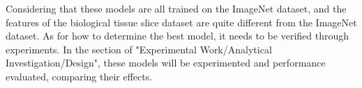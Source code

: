 Considering that these models are all trained on the ImageNet dataset, and the features of the biological tissue slice dataset are quite different from the ImageNet dataset. As for how to determine the best model, it needs to be verified through experiments. In the section of "Experimental Work/Analytical Investigation/Design", these models will be experimented and performance evaluated, comparing their effects.






